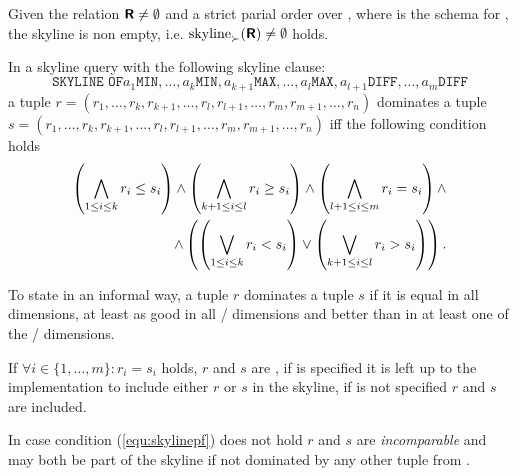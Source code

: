 \begin{lemma}
Given the relation $\textnormal{\bf\textsf{R}} \not= \emptyset$ and \dominates a strict parial order over , where  is the schema for , the skyline is non empty, i.e. $\skyline_\dominates(\relation{R}) \not= \emptyset$ holds.
\end{lemma}


In a skyline query with the following skyline clause:
\[
\texttt{SKYLINE OF} a_1 \texttt{MIN}, \ldots, a_k \texttt{MIN}, a_{k+1} \texttt{MAX}, \ldots, a_l \texttt{MAX}, a_{l+1} \texttt{DIFF}, \ldots, a_m \texttt{DIFF}
\]
a tuple 
$r = (r_1, \ldots, r_k, r_{k+1}, \ldots, r_l, r_{l+1}, \ldots, r_m, r_{m+1}, \ldots, r_n)$
dominates a tuple
$s = (r_1, \ldots, r_k, r_{k+1}, \ldots, r_l, r_{l+1}, \ldots, r_m, r_{m+1}, \ldots, r_n)$
iff the following condition holds
\begin{eqnarray}\label{equ:skylinepf}
\left( \bigwedge_{1 \le i \le k} r_i \le s_i \right) \land
\left( \bigwedge_{k+1 \le i \le l} r_i \ge s_i \right) \land
\left( \bigwedge_{l+1 \le i \le m} r_i = s_i \right) \land \nonumber\\
\land
\left( \left( \bigvee_{1 \le i \le k} r_i < s_i \right) \lor
       \left( \bigvee_{k+1 \le i \le l} r_i > s_i \right) \right).
\end{eqnarray}

To state in an informal way, a tuple $r$ dominates a tuple $s$ if it is equal in all  dimensions, at least as good in all / dimensions and better than in at least one of the / dimensions.



If $\forall i \in \{1, \ldots, m\}: r_i = s_i$ holds, $r$ and $s$ are , if  is specified it is left up to the implementation to include either $r$ or $s$ in the skyline, if  is not specified $r$ and $s$ are included. 


In case condition (\ref{equ:skylinepf}) does not hold $r$ and $s$ are \emph{incomparable} and may both be part of the skyline if not dominated by any other tuple from .

